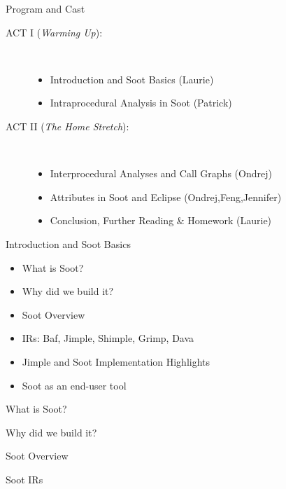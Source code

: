 \begin{slide}{Program and Cast}
\begin{description}
\item[ACT I ({\em Warming Up}):] \hspace{1in} \\
\begin{itemize}
\item Introduction and Soot Basics {\blue (Laurie)}
\item Intraprocedural Analysis in Soot {\blue (Patrick)}
\end{itemize}
\item[ACT II ({\em The Home Stretch}):] \hspace{1in} \\
\begin{itemize}
\item Interprocedural Analyses and Call Graphs {\blue (Ondrej)}
\item Attributes in Soot and Eclipse {\blue (Ondrej,Feng,Jennifer)}
\item Conclusion, Further Reading \& Homework {\blue (Laurie)}
\end{itemize}
\end{description}
\end{slide}

\begin{slide}{Introduction and Soot Basics}
\begin{itemize}
\item What is Soot?
\item Why did we build it?
\item Soot Overview
\item IRs: Baf, {\red Jimple}, Shimple, Grimp, Dava
\item Jimple and Soot Implementation Highlights 
\item Soot as an end-user tool 
\end{itemize}
\end{slide}

\begin{slide}{What is Soot?}
\end{slide}

\begin{slide}{Why did we build it?}
\end{slide}

\begin{slide}{Soot Overview}
\end{slide}

\begin{slide}{Soot IRs}
\end{slide}

